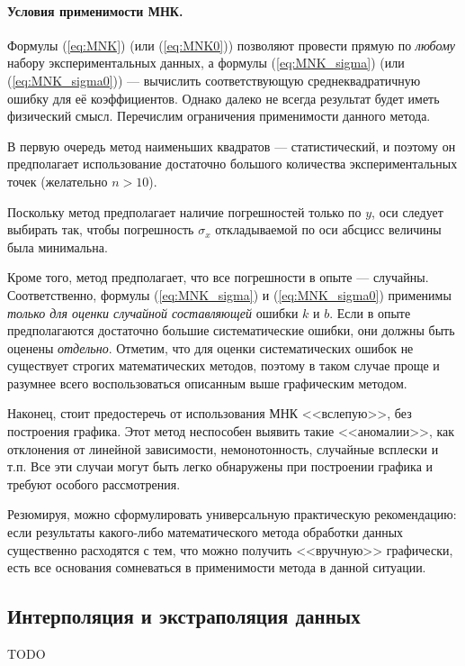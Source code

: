 \documentclass[10pt]{article}
\begin{document}
\paragraph{Условия применимости МНК.}

Формулы (\ref{eq:MNK}) (или (\ref{eq:MNK0})) позволяют провести
прямую по \emph{любому} набору экспериментальных данных, а формулы
(\ref{eq:MNK_sigma}) (или (\ref{eq:MNK_sigma0})) --- вычислить
соответствующую среднеквадратичную ошибку для её коэффициентов. Однако
далеко не всегда результат будет иметь физический смысл. Перечислим
ограничения применимости данного метода.

В первую очередь метод наименьших квадратов --- статистический,
и поэтому он предполагает использование достаточно большого количества
экспериментальных точек (желательно $n>10$).

Поскольку метод предполагает наличие погрешностей только по $y$,
оси следует выбирать так, чтобы погрешность $\sigma_{x}$ откладываемой
по оси абсцисс величины была минимальна.

Кроме того, метод предполагает, что все погрешности в опыте ---
случайны. Соответственно, формулы (\ref{eq:MNK_sigma}) и (\ref{eq:MNK_sigma0})
применимы \emph{только для оценки случайной составляющей} ошибки $k$
и $b$. Если в опыте предполагаются достаточно большие систематические
ошибки, они должны быть оценены \emph{отдельно}. Отметим, что для
оценки систематических ошибок не существует строгих математических
методов, поэтому в таком случае проще и разумнее всего воспользоваться
описанным выше графическим методом.

Наконец, стоит предостеречь от использования МНК <<вслепую>>,
без построения графика. Этот метод неспособен выявить такие <<аномалии>>,
как отклонения от линейной зависимости, немонотонность, случайные
всплески и т.п. Все эти случаи могут быть легко обнаружены при построении
графика и требуют особого рассмотрения.

Резюмируя, можно сформулировать универсальную практическую рекомендацию:
если результаты какого-либо математического метода обработки данных
существенно расходятся с тем, что можно получить <<вручную>>
графически, есть все основания сомневаться в применимости метода в
данной ситуации.

\subsection{Интерполяция и экстраполяция данных}

TODO
\end{document}
